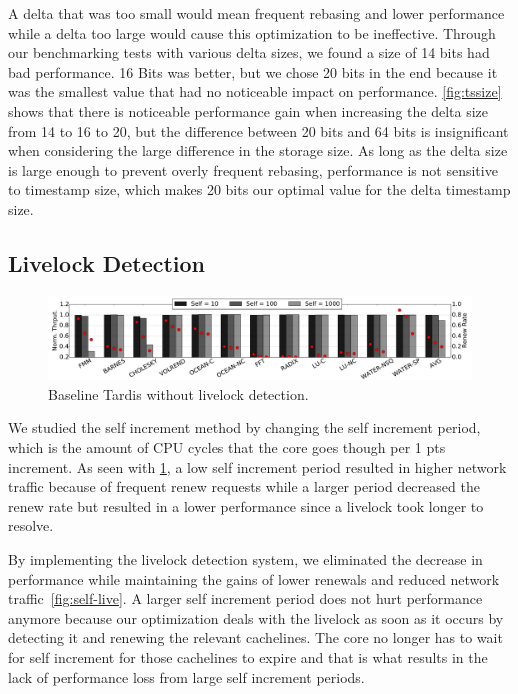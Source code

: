 \documentclass[12pt]{article}
\begin{document}
A delta that was too small would mean frequent rebasing and lower 
performance while a delta too large would cause this optimization to 
be ineffective. Through our benchmarking tests with various delta 
sizes, we found a size of 14 bits had bad performance. 16 Bits was 
better, but we chose 20 bits in the end because it was the smallest 
value that had no noticeable impact on performance. \cref{fig:tssize} shows 
that  there is noticeable performance gain when increasing the delta 
size from 14 to 16 to 20, but the difference between 20 bits and 64 
bits is insignificant when considering the large difference in the 
storage size. As long as the delta size is large enough to prevent 
overly frequent rebasing, performance is not sensitive to timestamp 
size, which makes 20 bits our optimal value for the delta timestamp 
size.

\subsection{Livelock Detection}

\begin{figure}
	\centering
	\includegraphics[width=0.95\columnwidth]{figs/selfincr_nolive.pdf}
	\caption{ Baseline Tardis without livelock detection. }
	\label{fig:self-nolive}
\end{figure}

We studied the self increment method by changing the self increment 
period, which is the amount of CPU cycles that the core goes though 
per 1 pts increment. As seen with \cref{fig:self-nolive}, a low self 
increment period resulted in higher network traffic because of 
frequent renew requests while a larger period decreased the renew rate 
but resulted in a lower performance since a livelock took longer to 
resolve.  
  
  
By implementing the livelock detection system, we eliminated the 
decrease in performance while maintaining the gains of lower renewals 
and reduced network traffic~\cref{fig:self-live}.  A larger self 
increment period does not hurt performance anymore because our 
optimization deals with the livelock as soon as it occurs by detecting 
it and renewing the relevant cachelines. The core no longer has to 
wait for self increment for those cachelines to expire and that is 
what results in the lack of performance loss from large self increment 
periods.
\end{document}
